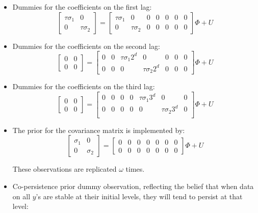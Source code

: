 \documentclass[10pt,a4paper]{article}
\begin{document}
\begin{itemize}
\item Dummies for the coefficients on the first lag:
$$\left[
\begin{array}{cc}
\tau\sigma_1 & 0 \\
0 & \tau\sigma_2
\end{array}
\right]
=
\left[
\begin{array}{ccccccc}
\tau\sigma_1 & 0 & 0&0& 0&0& 0 \\
0 & \tau\sigma_2 & 0&0& 0&0& 0
\end{array}
\right]\Phi + U$$

\item Dummies for the coefficients on the second lag:
$$\left[
\begin{array}{cc}
0 & 0 \\
0 & 0
\end{array}
\right]
=
\left[
\begin{array}{ccccccc}
0&0& \tau\sigma_1 2^d & 0 & 0&0& 0 \\
0&0& 0 & \tau\sigma_2 2^d & 0&0& 0
\end{array}
\right]\Phi + U$$

\item Dummies for the coefficients on the third lag:
$$\left[
\begin{array}{cc}
0 & 0 \\
0 & 0 
\end{array}
\right]
=
\left[
\begin{array}{ccccccc}
0&0& 0&0& \tau\sigma_1 3^d & 0 & 0 \\
0&0& 0&0& 0 & \tau\sigma_2 3^d & 0 \\
\end{array}
\right]\Phi + U$$

\item The prior for the covariance matrix is implemented by:
$$\left[
\begin{array}{cc}
\sigma_1 & 0 \\
0 & \sigma_2
\end{array}
\right]
=
\left[
\begin{array}{ccccccc}
0&0& 0&0& 0&0& 0 \\
0&0& 0&0& 0&0& 0
\end{array}
\right]\Phi + U$$

These observations are replicated $\omega$ times.

\item Co-persistence prior dummy observation, reflecting the belief that when data on all $y$'s are stable at their initial levels, they will tend to persist at that level:


\end{itemize}
\end{document}

